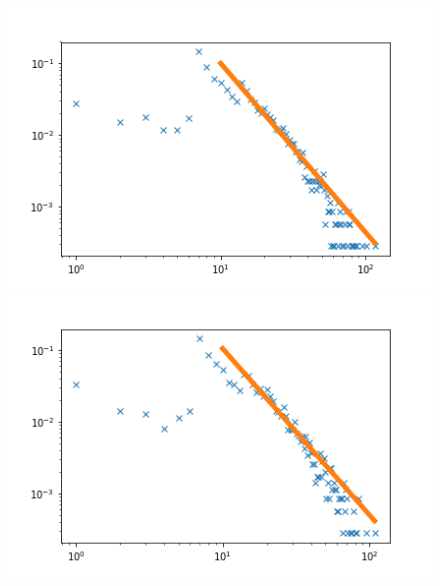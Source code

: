 \documentclass[12pt,twoside]{report}
\begin{document}
\begin{figure}[H]
\begin{center}
\begin{minipage}{0.45\linewidth}
\includegraphics[width=\linewidth]{figures/degs/1.png}
\end{minipage}%
\hfill
\begin{minipage}{0.45\linewidth}
\includegraphics[width=\linewidth]{figures/degs/3.png}
\end{minipage}
\end{center}
\begin{center}
\begin{minipage}{0.45\linewidth}

\end{minipage}
\end{center}
\end{figure}
\end{document}
